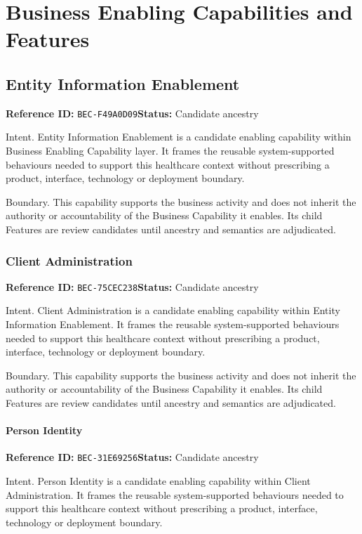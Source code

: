 \documentclass[11pt,a4paper,openany]{book}
\begin{document}
\part{Business Enabling Capabilities and Features}
\chapter{Entity Information Enablement}\label{cap:bec-f49a0d09}
\noindent\textbf{Reference ID:} \texttt{BEC-F49A0D09}\quad \textbf{Status:} Candidate ancestry\par
Intent. Entity Information Enablement is a candidate enabling capability within Business Enabling Capability layer. It frames the reusable system-supported behaviours needed to support this healthcare context without prescribing a product, interface, technology or deployment boundary.

Boundary. This capability supports the business activity and does not inherit the authority or accountability of the Business Capability it enables. Its child Features are review candidates until ancestry and semantics are adjudicated.

\section{Client Administration}\label{cap:bec-75cec238}
\noindent\textbf{Reference ID:} \texttt{BEC-75CEC238}\quad \textbf{Status:} Candidate ancestry\par
Intent. Client Administration is a candidate enabling capability within Entity Information Enablement. It frames the reusable system-supported behaviours needed to support this healthcare context without prescribing a product, interface, technology or deployment boundary.

Boundary. This capability supports the business activity and does not inherit the authority or accountability of the Business Capability it enables. Its child Features are review candidates until ancestry and semantics are adjudicated.

\subsection{Person Identity}\label{cap:bec-31e69256}
\noindent\textbf{Reference ID:} \texttt{BEC-31E69256}\quad \textbf{Status:} Candidate ancestry\par
Intent. Person Identity is a candidate enabling capability within Client Administration. It frames the reusable system-supported behaviours needed to support this healthcare context without prescribing a product, interface, technology or deployment boundary.
\end{document}
